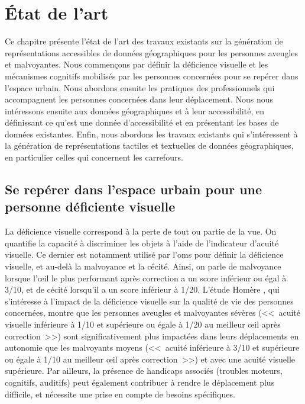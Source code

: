 \chapter{État de l'art}

\label{chap:etat_art}

Ce chapitre présente l'état de l'art des travaux existants sur la génération de représentations accessibles de données géographiques pour les personnes aveugles et malvoyantes. Nous commençons par définir la déficience visuelle et les mécanismes cognitifs mobilisés par les personnes concernées pour se repérer dans l'espace urbain. Nous abordons ensuite les pratiques des professionnels qui accompagnent les personnes concernées dans leur déplacement. Nous nous intéressons ensuite aux données géographiques et à leur accessibilité, en définissant ce qu'est une donnée d'accessibilité et en présentant les bases de données existantes. Enfin, nous abordons les travaux existants qui s'intéressent à la génération de représentations tactiles et textuelles de données géographiques, en particulier celles qui concernent les carrefours.

\section{Se repérer dans l'espace urbain pour une personne déficiente visuelle}

%
%

La déficience visuelle correspond à la perte de tout ou partie de la vue. On quantifie la capacité à discriminer les objets à l'aide de l'indicateur d'acuité visuelle. Ce dernier est notamment utilisé par l'\gls{oms} pour définir la déficience visuelle, et au-delà la malvoyance et la cécité. Ainsi, on parle de malvoyance lorsque l'œil le plus performant après correction a un score inférieur ou égal à 3/10, et de cécité lorsqu'il a un score inférieur à 1/20. L'étude Homère \citep{homere_2023}, qui s'intéresse à l'impact de la déficience visuelle sur la qualité de vie des personnes concernées, montre que les personnes aveugles et malvoyantes sévères (<<~acuité visuelle inférieure à 1/10 et supérieure ou égale à 1/20 au meilleur œil après correction~>>) sont significativement plus impactées dans leurs déplacements en autonomie que les malvoyants moyens (<<~acuité inférieure à 3/10 et supérieure ou égale à 1/10 au meilleur œil après correction~>>) et avec une acuité visuelle supérieure. Par ailleurs, la présence de handicaps associés (troubles moteurs, cognitifs, auditifs) peut également contribuer à rendre le déplacement plus difficile, et nécessite une prise en compte de besoins spécifiques.

